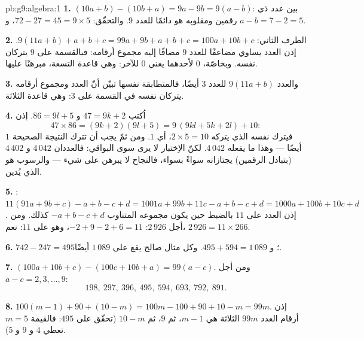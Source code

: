 \begin{solution}{pb:g9:algebra:1}
\textbf{1.} $(10a + b) - (10b + a) = 9a - 9b = 9(a - b)$:
 بين عدد ذي رقمين ومقلوبه هو دائمًا  للعدد
$9$. والتحقّق: $72 - 27 = 45 = 9 \times 5$،
و $a - b = 7 - 2 = 5$.

\textbf{2.}  الطرف الثاني:
$9(11a + b) + a + b + c = 99a + 9b + a + b + c
= 100a + 10b + c$. إذن العدد يساوي مضاعفًا للعدد $9$ مضافًا
إليه مجموع أرقامه: فبالقسمة على $9$ يتركان  نفسه.
وبخاصّة،  $0$ لأحدهما يعني  $0$ للآخر: وهي
قاعدة التسعة، مبرهنًا عليها.

\textbf{3.} والعدد $9(11a + b)$  للعدد $3$ أيضًا،
فالمتطابقة نفسها تبيّن أنّ العدد ومجموع أرقامه يتركان
 نفسه في القسمة على $3$: وهي قاعدة الثلاثة.

\textbf{4.} اُكتب $47 = 9k + 2$ و $86 = 9l + 5$. إذن
\[
47 \times 86 = (9k + 2)(9l + 5)
= 9\,(9kl + 5k + 2l) + 10 :
\]
فيترك   نفسه الذي يتركه $2 \times 5 = 10$،
أي $1$. ومن ثمّ يجب أن تترك النتيجة الصحيحة  $1$
أيضًا --- وهذا ما يفعله $4\,042$. لكنّ الاِختبار لا يرى سوى
البواقي: فالعددان $4\,042$ و $4\,402$ (بتبادل الرقمين)
يجتازانه سواءً بسواء، فالنجاح لا يبرهن على شيء --- والرسوب هو
الذي يُدين.

\textbf{5.} : $11(91a + 9b + c) - a + b - c + d
= 1001a + 99b + 11c - a + b - c + d
= 1000a + 100b + 10c + d$. إذن العدد  على $11$
بالضبط حين يكون مجموعه المتناوب $-a + b - c + d$ كذلك. ومن أجل
$2\,926$: $-2 + 9 - 2 + 6 = 11$، وهو  على $11$: نعم،
$2\,926 = 11 \times 266$.

\textbf{6.} $742 - 247 = 495$؛ و $495 + 594 = 1\,089$. وكل مثال
صالح يقع على $1\,089$ أيضًا.

\textbf{7.} $(100a + 10b + c) - (100c + 10b + a) = 99(a - c)$.
ومن أجل $a - c = 2, 3, \dots, 9$:
\[
198,\ 297,\ 396,\ 495,\ 594,\ 693,\ 792,\ 891 .
\]

\textbf{8.} $100(m - 1) + 90 + (10 - m) = 100m - 100 + 90 + 10
- m = 99m$. إذن أرقام العدد $99m$ الثلاثة هي $m - 1$، ثم $9$،
ثم $10 - m$ (تحقّق على $495$: فالقيمة $m = 5$ تعطي $4$ و $9$ و $5$).


\end{solution}
